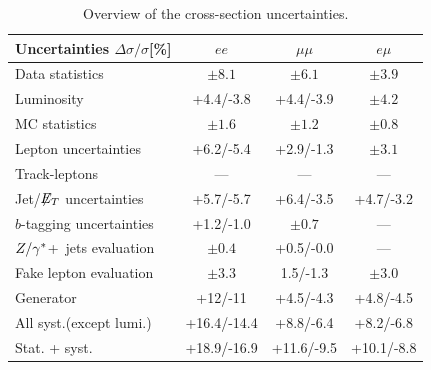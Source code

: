 %

\begin{table}[htb]
  \centering
      \begin{tabular}{|l|c|c|c|}
        \hline
        Uncertainties  $\Delta\sigma/\sigma$[\%]        & $ee$              & $\mu\mu$          & $e\mu$ \\ \hline

        Data statistics           &    $\pm 8.1$  &    $\pm 6.1$  &    $\pm 3.9$  \\
        \hline
        Luminosity                &    +4.4/-3.8 &    +4.4/-3.9   &    $\pm 4.2$  \\
        \hline
        MC statistics             &    $\pm 1.6$  &    $\pm 1.2$  &    $\pm 0.8$  \\
        Lepton uncertainties      &    +6.2/-5.4  &    +2.9/-1.3  &    $\pm 3.1$  \\
        Track-leptons             &     ---       &    ---        & ---           \\
        Jet/$\not\!\!{E_{T}}$ uncertainties  &    +5.7/-5.7  &    +6.4/-3.5  & +4.7/-3.2     \\
        $b$-tagging uncertainties &    +1.2/-1.0  &    $\pm 0.7$  &     ---       \\
        $Z/\gamma^{*}$+~jets evaluation    &    $\pm 0.4$  &    +0.5/-0.0  &     ---       \\
        Fake lepton evaluation    &    $\pm 3.3$  &    1.5/-1.3   &    $\pm 3.0$  \\
        Generator                 &   +12/-11     &    +4.5/-4.3  &   +4.8/-4.5   \\
        \hline
        All syst.(except lumi.)   &   +16.4/-14.4 &    +8.8/-6.4  &    +8.2/-6.8  \\
        \hline \hline
        Stat. + syst.             &   +18.9/-16.9 &    +11.6/-9.5 &    +10.1/-8.8 \\
        \hline

      \end{tabular}
    \caption{Overview of the \ttbar{} cross-section uncertainties.}
    \label{tab:syssum}
\end{table}



